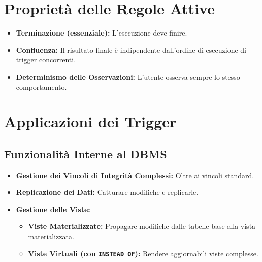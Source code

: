 \section{Proprietà delle Regole Attive}
\begin{itemize}
	\item \textbf{Terminazione (essenziale):} L'esecuzione deve finire.
	\item \textbf{Confluenza:} Il risultato finale è indipendente dall'ordine di esecuzione di trigger concorrenti.
	\item \textbf{Determinismo delle Osservazioni:} L'utente osserva sempre lo stesso comportamento.
\end{itemize}

\section{Applicazioni dei Trigger}
\subsection{Funzionalità Interne al DBMS}
\begin{itemize}
	\item \textbf{Gestione dei Vincoli di Integrità Complessi:} Oltre ai vincoli standard.
	\item \textbf{Replicazione dei Dati:} Catturare modifiche e replicarle.
	\item \textbf{Gestione delle Viste:}
	\begin{itemize}
		\item \textbf{Viste Materializzate:} Propagare modifiche dalle tabelle base alla vista materializzata.
		\item \textbf{Viste Virtuali (con \texttt{INSTEAD OF}):} Rendere aggiornabili viste complesse.
	\end{itemize}
\end{itemize}

